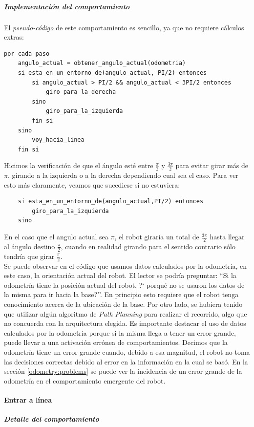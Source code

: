 \subparagraph{Implementaci\'on del comportamiento}
El \emph{pseudo-c\'odigo} de este comportamiento es sencillo, ya que
no requiere c\'alculos extras:

\begin{verbatim}
por cada paso
    angulo_actual = obtener_angulo_actual(odometria)
    si esta_en_un_entorno_de(angulo_actual, PI/2) entonces
        si angulo_actual > PI/2 && angulo_actual < 3PI/2 entonces
            giro_para_la_derecha
        sino
            giro_para_la_izquierda
        fin si
    sino
        voy_hacia_linea
    fin si
\end{verbatim}

Hicimos la verificaci\'on de que el \'angulo est\'e entre $\frac{\pi}{2}$ y
$\frac{3\pi}{2}$ para evitar girar m\'as de $\pi$, girando a la izquierda o a
la derecha dependiendo cual sea el caso. Para ver esto m\'as claramente,
veamos que sucediese si no estuviera:
\begin{verbatim}
    si esta_en_un_entorno_de(angulo_actual,PI/2) entonces
        giro_para_la_izquierda
    sino
\end{verbatim}
En el caso que el angulo actual sea $\pi$, el robot girar\'ia un total de
$\frac{3\pi}{2}$ hasta llegar al \'angulo destino $\frac{\pi}{2}$, cuando en
realidad girando para el sentido contrario s\'olo tendr\'ia que girar
$\frac{\pi}{2}$.
\\\indent
Se puede observar en el c\'odigo que usamos datos calculados por la
odometr\'ia, en este caso, la orientaci\'on actual del robot. El lector se
podr\'ia preguntar: ``Si la odometr\'ia tiene la posici\'on actual del robot,
?` porqu\'e no se usaron los datos de la misma para ir hacia la base?''. En
principio esto requiere que el robot tenga conocimiento acerca de la ubicaci\'on
de la base. Por otro lado, se hubiera tenido que utilizar alg\'un algoritmo de
\emph{Path Planning} para realizar el recorrido, algo que no concuerda con
la arquitectura elegida. Es importante destacar el uso de datos calculados por
la odometr\'ia porque si la misma llega a tener un error grande, puede llevar a
una activaci\'on err\'onea de comportamientos. Decimos que la odometr\'ia tiene
un error grande cuando, debido a esa magnitud, el robot no toma las decisiones
correctas debido al error en la informaci\'on en la cual se bas\'o. En la
secci\'on \ref{odometry:problems} se puede ver la incidencia de un error grande
de la odometr\'ia en el comportamiento emergente del robot.

\paragraph{Entrar a l\'inea}
\label{enter_line}
\subparagraph{Detalle del comportamiento}

